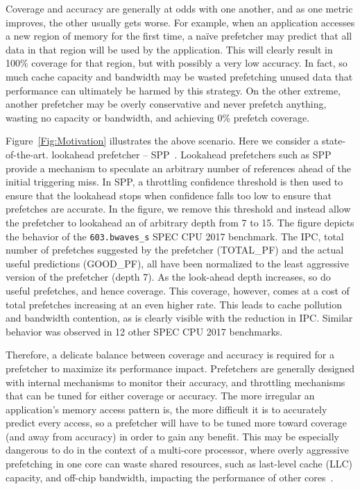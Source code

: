 Coverage and accuracy are generally at odds with one another, and as
one metric improves, the other usually gets worse. For example, when
an application accesses a new region of memory for the first time, a
na\"ive prefetcher may predict that all data in that region will be
used by the application.  This will clearly result in 100\% coverage
for that region, but with possibly a very low accuracy.  In fact, so
much cache capacity and bandwidth may be wasted prefetching unused
data that performance can ultimately be harmed by this strategy. On
the other extreme, another prefetcher may be overly conservative and
never prefetch anything, wasting no capacity or bandwidth, and
achieving 0\% prefetch coverage.

Figure~\ref{Fig:Motivation} illustrates the above scenario.  Here we
consider a state-of-the-art. lookahead prefetcher -- SPP~\cite{SPP}.
Lookahead prefetchers such as SPP provide a mechanism to speculate an
arbitrary number of references ahead of the initial triggering miss.
In SPP, a throttling confidence threshold is then used to ensure that
the lookahead stops when confidence falls too low to ensure that
prefetches are accurate.  In the figure, we remove this threshold and
instead allow the prefetcher to lookahead an of arbitrary depth from 7
to 15.  The figure depicts the behavior of the {\tt 603.bwaves\_s}
SPEC CPU 2017 benchmark.  The IPC, total number of prefetches
suggested by the prefetcher (TOTAL\_PF) and the actual useful
predictions (GOOD\_PF), all have been normalized to the least
aggressive version of the prefetcher (depth 7).  As the look-ahead
depth increases, so do useful prefetches, and hence coverage.  This
coverage, however, comes at a cost of total prefetches increasing at
an even higher rate.  This leads to cache pollution and bandwidth
contention, as is clearly visible with the reduction in IPC.  Similar
behavior was observed in 12 other SPEC CPU 2017 benchmarks.

Therefore, a delicate balance between coverage and accuracy is
required for a prefetcher to maximize its performance impact.
Prefetchers are generally designed with internal mechanisms to monitor
their accuracy, and throttling mechanisms that can be tuned for either
coverage or accuracy.  The more irregular an application's memory
access pattern is, the more difficult it is to accurately predict
every access, so a prefetcher will have to be tuned more toward
coverage (and away from accuracy) in order to gain any benefit. This
may be especially dangerous to do in the context of a multi-core
processor, where overly aggressive prefetching in one core can waste
shared resources, such as last-level cache (LLC) capacity, and
off-chip bandwidth, impacting the performance of other
cores~\cite{Friendly}.

